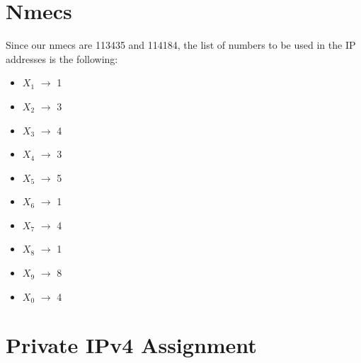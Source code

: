 \documentclass{report}
\begin{document}
\renewcommand{\headrulewidth}{0pt} %
\renewcommand{\footrulewidth}{0.5pt}
\pagestyle{plain}

\chapter*{Nmecs}
Since our nmecs are 113435 and 114184, the list of numbers to be used in the IP addresses is the following:

\begin{itemize}
    \item \textbf{$X_1$} $\rightarrow$ 1
    \item \textbf{$X_2$} $\rightarrow$ 3
    \item \textbf{$X_3$} $\rightarrow$ 4
    \item \textbf{$X_4$} $\rightarrow$ 3
    \item \textbf{$X_5$} $\rightarrow$ 5
    \item \textbf{$X_6$} $\rightarrow$ 1
    \item \textbf{$X_7$} $\rightarrow$ 4
    \item \textbf{$X_8$} $\rightarrow$ 1
    \item \textbf{$X_9$} $\rightarrow$ 8
    \item \textbf{$X_0$} $\rightarrow$ 4
\end{itemize}

\chapter*{Private IPv4 Assignment}
\end{document}
